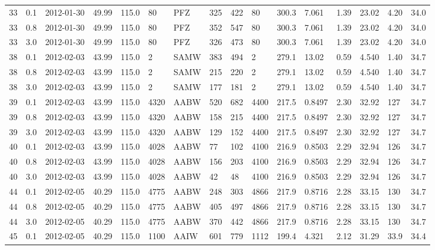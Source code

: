 {{\begin{landscape}
\begin{longtable}{llllllllllllllll}
33 & 0.1 & 2012-01-30 & \textminus{}49.99 & 115.0 & 80 & PFZ & 325 & 422 & 80 & 300.3 & 7.061 & 1.39 & 23.02 & 4.20 & 34.0\\
33 & 0.8 & 2012-01-30 & \textminus{}49.99 & 115.0 & 80 & PFZ & 352 & 547 & 80 & 300.3 & 7.061 & 1.39 & 23.02 & 4.20 & 34.0\\
33 & 3.0 & 2012-01-30 & \textminus{}49.99 & 115.0 & 80 & PFZ & 326 & 473 & 80 & 300.3 & 7.061 & 1.39 & 23.02 & 4.20 & 34.0\\
38 & 0.1 & 2012-02-03 & \textminus{}43.99 & 115.0 & 2 & SAMW & 383 & 494 & 2 & 279.1 & 13.02 & 0.59 & 4.540 & 1.40 & 34.7\\
38 & 0.8 & 2012-02-03 & \textminus{}43.99 & 115.0 & 2 & SAMW & 215 & 220 & 2 & 279.1 & 13.02 & 0.59 & 4.540 & 1.40 & 34.7\\
38 & 3.0 & 2012-02-03 & \textminus{}43.99 & 115.0 & 2 & SAMW & 177 & 181 & 2 & 279.1 & 13.02 & 0.59 & 4.540 & 1.40 & 34.7\\
39 & 0.1 & 2012-02-03 & \textminus{}43.99 & 115.0 & 4320 & AABW & 520 & 682 & 4400 & 217.5 & 0.8497 & 2.30 & 32.92 & 127 & 34.7\\
39 & 0.8 & 2012-02-03 & \textminus{}43.99 & 115.0 & 4320 & AABW & 158 & 215 & 4400 & 217.5 & 0.8497 & 2.30 & 32.92 & 127 & 34.7\\
39 & 3.0 & 2012-02-03 & \textminus{}43.99 & 115.0 & 4320 & AABW & 129 & 152 & 4400 & 217.5 & 0.8497 & 2.30 & 32.92 & 127 & 34.7\\
40 & 0.1 & 2012-02-03 & \textminus{}43.99 & 115.0 & 4028 & AABW & 77 & 102 & 4100 & 216.9 & 0.8503 & 2.29 & 32.94 & 126 & 34.7\\
40 & 0.8 & 2012-02-03 & \textminus{}43.99 & 115.0 & 4028 & AABW & 156 & 203 & 4100 & 216.9 & 0.8503 & 2.29 & 32.94 & 126 & 34.7\\
40 & 3.0 & 2012-02-03 & \textminus{}43.99 & 115.0 & 4028 & AABW & 42 & 48 & 4100 & 216.9 & 0.8503 & 2.29 & 32.94 & 126 & 34.7\\
44 & 0.1 & 2012-02-05 & \textminus{}40.29 & 115.0 & 4775 & AABW & 248 & 303 & 4866 & 217.9 & 0.8716 & 2.28 & 33.15 & 130 & 34.7\\
44 & 0.8 & 2012-02-05 & \textminus{}40.29 & 115.0 & 4775 & AABW & 405 & 497 & 4866 & 217.9 & 0.8716 & 2.28 & 33.15 & 130 & 34.7\\
44 & 3.0 & 2012-02-05 & \textminus{}40.29 & 115.0 & 4775 & AABW & 370 & 442 & 4866 & 217.9 & 0.8716 & 2.28 & 33.15 & 130 & 34.7\\
45 & 0.1 & 2012-02-05 & \textminus{}40.29 & 115.0 & 1100 & AAIW & 601 & 779 & 1112 & 199.4 & 4.321 & 2.12 & 31.29 & 33.9 & 34.4\\

\end{longtable}
\end{landscape}}}
